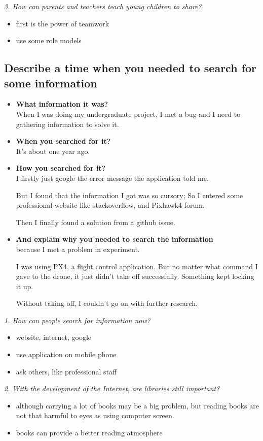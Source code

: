 \documentclass[conference]{IEEEtran}
\begin{document}
\textit{3. How can parents and teachers teach young children to share?}
\begin{itemize}
    \item first is the power of teamwork
    \item use some role models
\end{itemize}

\subsection{Describe a time when you needed to search for some information}
\begin{itemize}
    \item \textbf{What information it was?}\\
    When I was doing my undergraduate project, I met a bug and I need to gathering information to solve it.
    \item \textbf{When you searched for it?}\\
    It's about one year ago.
    \item \textbf{How you searched for it?}\\
    I firstly just google the error message the application told me.

    But I found that the information I got was so cursory;
    So I entered some professional website like stackoverflow, and Pixhawk4 forum.

    Then I finally found a solution from a github issue. 
    \item \textbf{And explain why you needed to search the information}\\
    because I met a problem in experiment.

    I was using PX4, a flight control application. But no matter what command I gave to the drone, 
    it just didn't take off successfully.
    Something kept locking it up.

    Without taking off, I couldn't go on with further research.
\end{itemize}

\textit{1. How can people search for information now?}
\begin{itemize}
    \item website, internet, google
    \item use application on mobile phone
    \item ask others, like professional staff
\end{itemize}

\textit{2. With the development of the Internet, are libraries still important?}
\begin{itemize}
    \item although carrying a lot of books may be a big problem, but reading books are not that harmful to eyes as using computer screen.
    \item books can provide a better reading atmosphere
\end{itemize}
\end{document}
